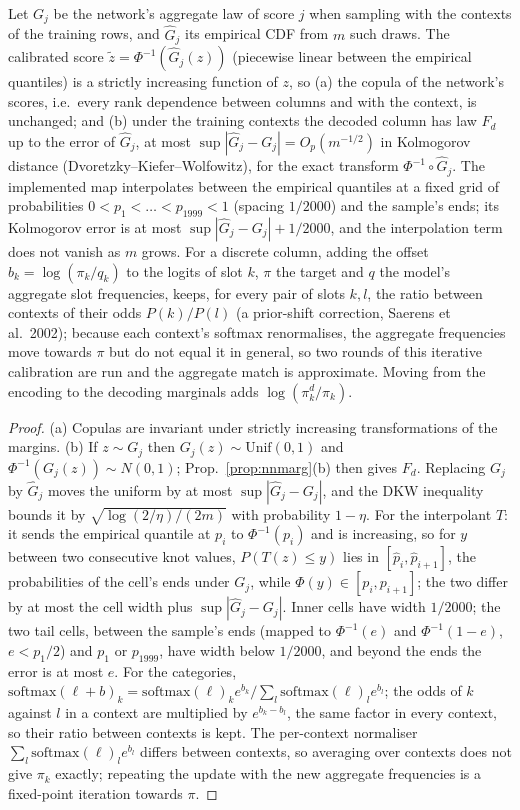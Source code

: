 \setcounter{proposition}{1804}
\begin{proposition}\label{prop:nncalib}
Let $G_j$ be the network's aggregate law of score $j$ when sampling with the contexts of the training rows, and $\hat G_j$ its empirical CDF from $m$ such draws. The calibrated score $\tilde z=\Phi^{-1}(\hat G_j(z))$ (piecewise linear between the empirical quantiles) is a strictly increasing function of $z$, so (a) the copula of the network's scores, i.e.\ every rank dependence between columns and with the context, is unchanged; and (b) under the training contexts the decoded column has law $F_d$ up to the error of $\hat G_j$, at most $\sup|\hat G_j-G_j|=O_p(m^{-1/2})$ in Kolmogorov distance (Dvoretzky--Kiefer--Wolfowitz), for the exact transform $\Phi^{-1}\circ\hat G_j$. The implemented map interpolates between the empirical quantiles at a fixed grid of probabilities $0<p_1<\dots<p_{1999}<1$ (spacing $1/2000$) and the sample's ends; its Kolmogorov error is at most $\sup|\hat G_j-G_j|+1/2000$, and the interpolation term does not vanish as $m$ grows. For a discrete column, adding the offset $b_k=\log(\pi_k/q_k)$ to the logits of slot $k$, $\pi$ the target and $q$ the model's aggregate slot frequencies, keeps, for every pair of slots $k,l$, the ratio between contexts of their odds $P(k)/P(l)$ (a prior-shift correction, Saerens et al.\ 2002); because each context's softmax renormalises, the aggregate frequencies move towards $\pi$ but do not equal it in general, so two rounds of this iterative calibration are run and the aggregate match is approximate. Moving from the encoding to the decoding marginals adds $\log(\pi^{d}_k/\pi_k)$.
\end{proposition}
\begin{proof}
(a) Copulas are invariant under strictly increasing transformations of the margins. (b) If $z\sim G_j$ then $G_j(z)\sim\mathrm{Unif}(0,1)$ and $\Phi^{-1}(G_j(z))\sim N(0,1)$; Prop.~\ref{prop:nnmarg}(b) then gives $F_d$. Replacing $G_j$ by $\hat G_j$ moves the uniform by at most $\sup|\hat G_j-G_j|$, and the DKW inequality bounds it by $\sqrt{\log(2/\eta)/(2m)}$ with probability $1-\eta$. For the interpolant $T$: it sends the empirical quantile at $p_i$ to $\Phi^{-1}(p_i)$ and is increasing, so for $y$ between two consecutive knot values, $P(T(z)\le y)$ lies in $[\hat p_i,\hat p_{i+1}]$, the probabilities of the cell's ends under $G_j$, while $\Phi(y)\in[p_i,p_{i+1}]$; the two differ by at most the cell width plus $\sup|\hat G_j-G_j|$. Inner cells have width $1/2000$; the two tail cells, between the sample's ends (mapped to $\Phi^{-1}(e)$ and $\Phi^{-1}(1-e)$, $e<p_1/2$) and $p_1$ or $p_{1999}$, have width below $1/2000$, and beyond the ends the error is at most $e$. For the categories, $\mathrm{softmax}(\ell+b)_k=\mathrm{softmax}(\ell)_k e^{b_k}/\sum_l \mathrm{softmax}(\ell)_l e^{b_l}$; the odds of $k$ against $l$ in a context are multiplied by $e^{b_k-b_l}$, the same factor in every context, so their ratio between contexts is kept. The per-context normaliser $\sum_l \mathrm{softmax}(\ell)_l e^{b_l}$ differs between contexts, so averaging over contexts does not give $\pi_k$ exactly; repeating the update with the new aggregate frequencies is a fixed-point iteration towards $\pi$.
\end{proof}

